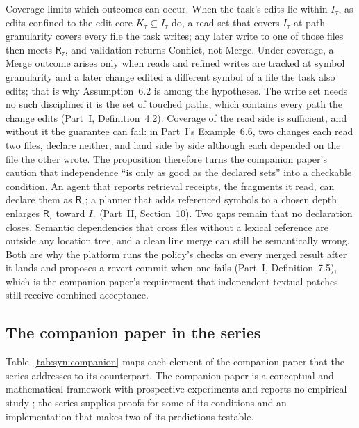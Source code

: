 \documentclass[11pt,letterpaper]{article}
\theoremstyle{definition}
\theoremstyle{remark}
\newcommand{\R}{\mathsf{R}}
\begin{document}
Coverage limits which outcomes can occur. When the task's edits lie within $I_\tau$, as edits confined to the edit core $K_\tau\subseteq I_\tau$ do, a read set that covers $I_\tau$ at path granularity covers every file the task writes; any later write to one of those files then meets $\R_\tau$, and validation returns Conflict, not Merge. Under coverage, a Merge outcome arises only when reads and refined writes are tracked at symbol granularity and a later change edited a different symbol of a file the task also edits; that is why Assumption~6.2 is among the hypotheses. The write set needs no such discipline: it is the set of touched paths, which contains every path the change edits (Part~I, Definition~4.2). Coverage of the read side is sufficient, and without it the guarantee can fail: in Part~I's Example~6.6, two changes each read two files, declare neither, and land side by side although each depended on the file the other wrote. The proposition therefore turns the companion paper's caution that independence ``is only as good as the declared sets'' \cite{long2026inversion} into a checkable condition. An agent that reports retrieval receipts, the fragments it read, can declare them as $\R_\tau$; a planner that adds referenced symbols to a chosen depth enlarges $\R_\tau$ toward $I_\tau$ (Part~II, Section~10). Two gaps remain that no declaration closes. Semantic dependencies that cross files without a lexical reference are outside any location tree, and a clean line merge can still be semantically wrong. Both are why the platform runs the policy's checks on every merged result after it lands and proposes a revert commit when one fails (Part~I, Definition~7.5), which is the companion paper's requirement that independent textual patches still receive combined acceptance.

\subsection{The companion paper in the series}

Table~\ref{tab:syn:companion} maps each element of the companion paper that the series addresses to its counterpart. The companion paper is a conceptual and mathematical framework with prospective experiments and reports no empirical study \cite{long2026inversion}; the series supplies proofs for some of its conditions and an implementation that makes two of its predictions testable.
\end{document}

